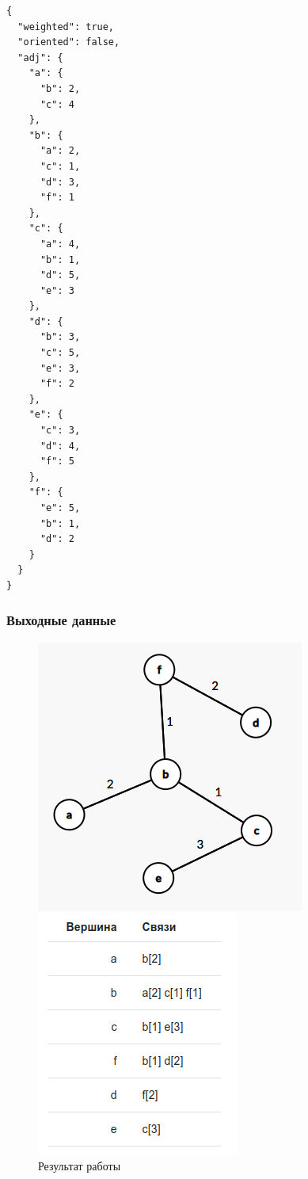 \begin{verbatim}
{
  "weighted": true,
  "oriented": false,
  "adj": {
    "a": {
      "b": 2,
      "c": 4
    },
    "b": {
      "a": 2,
      "c": 1,
      "d": 3,
      "f": 1
    },
    "c": {
      "a": 4,
      "b": 1,
      "d": 5,
      "e": 3
    },
    "d": {
      "b": 3,
      "c": 5,
      "e": 3,
      "f": 2
    },
    "e": {
      "c": 3,
      "d": 4,
      "f": 5
    },
    "f": {
      "e": 5,
      "b": 1,
      "d": 2
    }
  }
}
\end{verbatim}

\subsubsection{Выходные данные}
\begin{figure}[H]
  \begin{minipage}{0.5\textwidth}
    \centering\includegraphics[width=0.8\linewidth]{figs/task-7/res-graph-7.png}
  \end{minipage}
  \begin{minipage}{0.5\textwidth}
    \centering\includegraphics[width=0.6\linewidth]{figs/task-7/res-7.png}
  \end{minipage}
  \caption{Результат работы}
\end{figure}